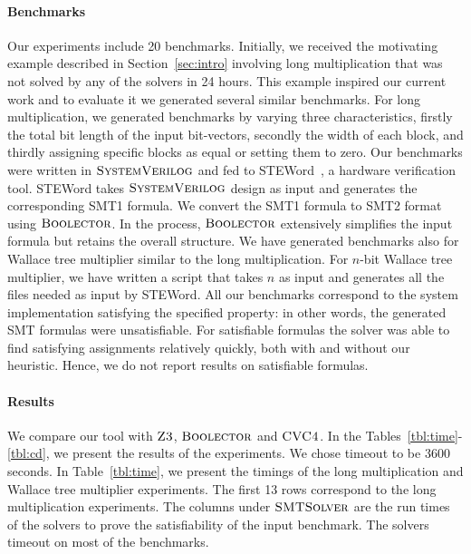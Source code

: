 \paragraph{\bf Benchmarks}
%
Our experiments include 20 benchmarks. 
%
Initially, we received the motivating example described in Section~\ref{sec:intro} involving long multiplication that was not solved by any
of the solvers in 24 hours.
%
This example inspired our current work and to evaluate it we generated several similar benchmarks.
%
For long multiplication, we generated benchmarks by varying three characteristics, firstly the total bit length of the input bit-vectors, secondly the width of each block, and thirdly assigning specific blocks as equal or setting them to zero.
%
Our benchmarks were written in $\textsc{SystemVerilog}$ and fed to STEWord~\cite{wste}, a hardware verification tool.
%
STEWord takes $\textsc{SystemVerilog}$ design as input and generates the corresponding SMT1 formula.
%
We convert the SMT1 formula to SMT2 format using $\textsc{Boolector}$.
%
In the process, $\textsc{Boolector}$ extensively simplifies the input formula but retains the overall structure.
%
We have generated benchmarks also for Wallace tree multiplier similar to the long multiplication.
%
For $n$-bit Wallace tree multiplier, we have written a script that takes $n$ as input and generates all the files needed as input by STEWord. All our benchmarks correspond to the system implementation satisfying the specified property: in other words, the generated SMT formulas were unsatisfiable. For satisfiable formulas the solver was able to find satisfying assignments relatively quickly, both with and without our heuristic. Hence, we do not report results on satisfiable formulas.
%

\paragraph{\bf Results}
%
We compare our tool with $\textsc{Z3}$, $\textsc{Boolector}$ and $\textsc{CVC4}$.
%
In the Tables~\ref{tbl:time}-\ref{tbl:cd}, we present the results of the experiments.
%
We chose timeout to be 3600 seconds.
%
In Table~\ref{tbl:time}, we present the timings of the long multiplication and
Wallace tree multiplier experiments.
%
The first 13 rows correspond to
the long multiplication experiments.
%
The columns under $\textsc{SMTSolver}$ are the run times of the
solvers to prove the satisfiability of the input benchmark.
%
The solvers timeout on most of the benchmarks.
%

